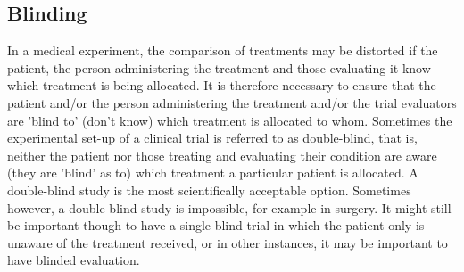 \documentclass[a4paper,12pt]{article}
\begin{document}
\subsection{Blinding}
In a medical experiment, the comparison of treatments may be distorted if the patient, the person administering the treatment and those evaluating it know which treatment is being allocated. It is therefore necessary to ensure that the patient and/or the person administering the treatment and/or the trial evaluators are 'blind to' (don't know) which treatment is allocated to whom.
Sometimes the experimental set-up of a clinical trial is referred to as double-blind, that is, neither the patient nor those treating and evaluating their condition are aware (they are 'blind' as to) which treatment a particular patient is allocated. A double-blind study is the most scientifically acceptable option.
Sometimes however, a double-blind study is impossible, for example in surgery. It might still be important though to have a single-blind trial in which the patient only is unaware of the treatment received, or in other instances, it may be important to have blinded evaluation.
\end{document}

